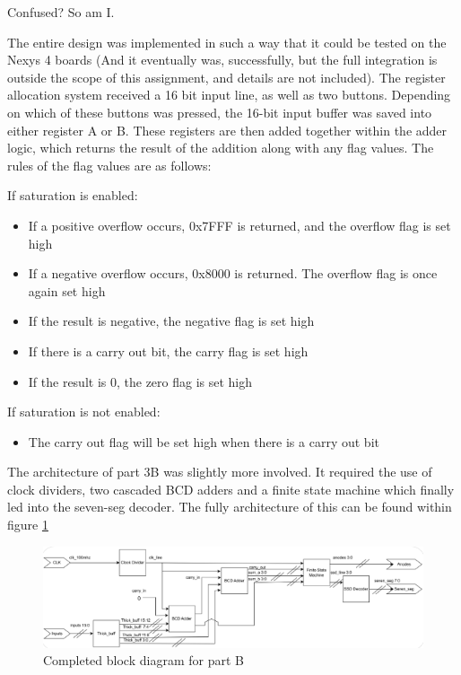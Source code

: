\documentclass[12pt,a4paper]{article}
\begin{document}
Confused? So am I.

The entire design was implemented in such a way that it could be tested on the Nexys 4 boards (And it eventually was, successfully, but the full integration is outside the scope of this assignment, and details are not included). The register allocation system received a 16 bit input line, as well as two buttons. Depending on which of these buttons was pressed, the 16-bit input buffer was saved into either register A or B. These registers are then added together within the adder logic, which returns the result of the addition along with any flag values. The rules of the flag values are as follows:

If saturation is enabled:
\begin{itemize}
    \item If a positive overflow occurs, 0x7FFF is returned, and the overflow flag is set high
    \item If a negative overflow occurs, 0x8000 is returned. The overflow flag is once again set high
    \item If the result is negative, the negative flag is set high
    \item If there is a carry out bit, the carry flag is set high
    \item If the result is 0, the zero flag is set high
\end{itemize}

If saturation is not enabled:
\begin{itemize}
    \item The carry out flag will be set high when there is a carry out bit
\end{itemize}

The architecture of part 3B was slightly more involved. It required the use of clock dividers, two cascaded BCD adders and a finite state machine which finally led into the seven-seg decoder. The fully architecture of this can be found within figure \ref{fig:block_b}

\begin{figure}[H]
    \centering
    \includegraphics[scale=0.75]{images/block_diagram_b.png}
    \caption{Completed block diagram for part B}
    \label{fig:block_b}
\end{figure}
\end{document}
